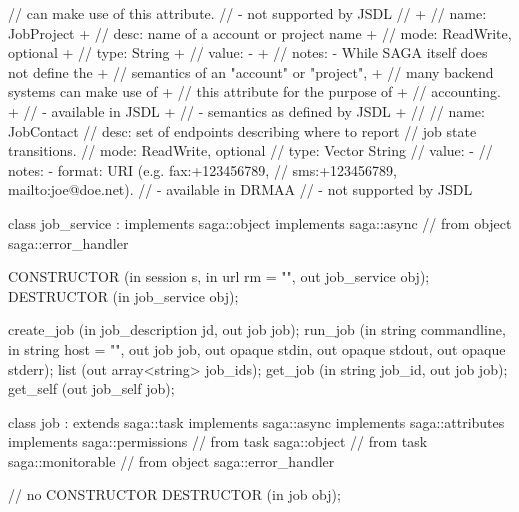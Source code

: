 \begin{myspec}
{{      //            can make use of this attribute. 
      //          - not supported by JSDL
      // 
+     //   name:  JobProject
+     //   desc:  name of a account or project name
+     //   mode:  ReadWrite, optional
+     //   type:  String
+     //   value: -
+     //   notes: - While SAGA itself does not define the 
+     //            semantics of an "account" or "project", 
+     //            many backend systems can make use of
+     //            this attribute for the purpose of 
+     //            accounting.
+     //          - available in JSDL
+     //          - semantics as defined by JSDL
+     // 
      //   name:  JobContact
      //   desc:  set of endpoints describing where to report 
      //          job state transitions.
      //   mode:  ReadWrite, optional
      //   type:  Vector String
      //   value: -
      //   notes: - format: URI (e.g. fax:+123456789, 
      //            sms:+123456789, mailto:joe@doe.net). 
      //          - available in DRMAA
      //          - not supported by JSDL
    }
 
 
    class job_service : implements   saga::object
                        implements   saga::async
                     // from object  saga::error_handler
    {
      CONSTRUCTOR          (in  session         s,
                            in  url             rm = "",
                            out job_service     obj);
      DESTRUCTOR           (in  job_service     obj);
 
      create_job           (in  job_description jd,
                            out job             job);
      run_job              (in  string          commandline,
                            in  string          host = "",
                            out job             job, 
                            out opaque          stdin,
                            out opaque          stdout,
                            out opaque          stderr);
      list                 (out array<string>   job_ids);
      get_job              (in  string          job_id,
                            out job             job);
      get_self             (out job_self        job);
    }
 
 
    class job : extends      saga::task
                implements   saga::async
                implements   saga::attributes
                implements   saga::permissions
             // from task    saga::object
             // from task    saga::monitorable
             // from object  saga::error_handler
    {
      // no CONSTRUCTOR
      DESTRUCTOR           (in  job             obj);
 
}}
\end{myspec}
